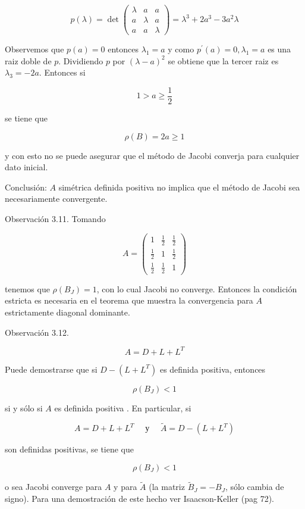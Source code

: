 \documentclass[10pt]{article}
\begin{document}
$$
p(\lambda)=\operatorname{det}\left(\begin{array}{ccc}
\lambda & a & a \\
a & \lambda & a \\
a & a & \lambda
\end{array}\right)=\lambda^{3}+2 a^{3}-3 a^{2} \lambda
$$

Observemos que $p(a)=0$ entonces $\lambda_{1}=a$ y como $p^{\prime}(a)=0, \lambda_{1}=a$ es una raiz doble de $p$. Dividiendo $p$ por $(\lambda-a)^{2}$ se obtiene que la tercer raiz es $\lambda_{3}=-2 a$. Entonces si

$$
1>a \geq \frac{1}{2}
$$

se tiene que

$$
\rho(B)=2 a \geq 1
$$

y con esto no se puede asegurar que el método de Jacobi converja para cualquier dato inicial.

Conclusión: $A$ simétrica definida positiva no implica que el método de Jacobi sea necesariamente convergente.

Observación 3.11. Tomando

$$
A=\left(\begin{array}{ccc}
1 & \frac{1}{2} & \frac{1}{2} \\
\frac{1}{2} & 1 & \frac{1}{2} \\
\frac{1}{2} & \frac{1}{2} & 1
\end{array}\right)
$$

tenemos que $\rho\left(B_{J}\right)=1$, con lo cual Jacobi no converge. Entonces la condición estricta es necesaria en el teorema que muestra la convergencia para $A$ estrictamente diagonal dominante.

Observación 3.12.

$$
A=D+L+L^{T}
$$

Puede demostrarse que si $D-\left(L+L^{T}\right)$ es definida positiva, entonces

$$
\rho\left(B_{J}\right)<1
$$

si y sólo si $A$ es definida positiva . En particular, si

$$
A=D+L+L^{T} \quad \text { у } \quad \tilde{A}=D-\left(L+L^{T}\right)
$$

son definidas positivas, se tiene que

$$
\rho\left(B_{J}\right)<1
$$

o sea Jacobi converge para $A$ y para $\tilde{A}$ (la matriz $\tilde{B}_{J}=-B_{J}$, sólo cambia de signo). Para una demostración de este hecho ver Isaacson-Keller (pag 72).
\end{document}
